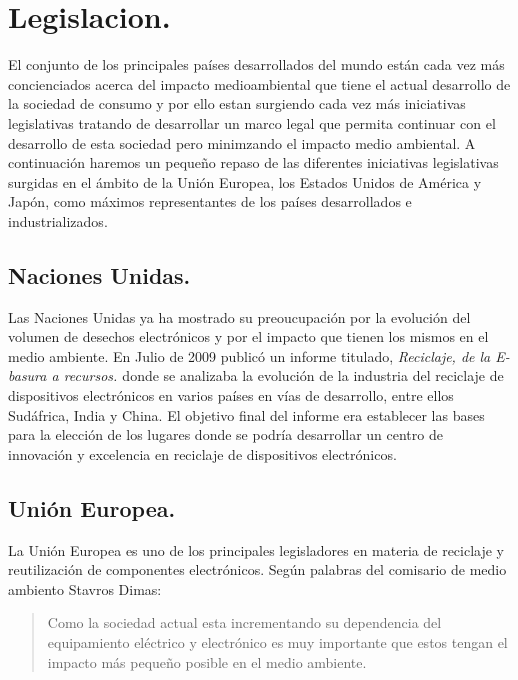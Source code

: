 \section{Legislacion.}

El conjunto de los principales países desarrollados del mundo están cada vez más concienciados acerca del impacto medioambiental que tiene el actual desarrollo de la sociedad de consumo y por ello estan surgiendo cada vez más iniciativas legislativas tratando de desarrollar un marco legal que permita continuar con el desarrollo de esta sociedad pero minimzando el impacto medio ambiental. A continuación haremos un pequeño repaso de las diferentes iniciativas legislativas surgidas en el ámbito de la Unión Europea, los Estados Unidos de América y Japón, como máximos representantes de los países desarrollados e industrializados.

\subsection{Naciones Unidas.}

Las Naciones Unidas ya ha mostrado su preoucupación por la evolución del volumen de desechos electrónicos y por el impacto que tienen los mismos en el medio ambiente. En Julio de 2009 publicó un informe titulado, \emph{Reciclaje, de la E-basura a recursos. \cite{onu-e-waste}} donde se analizaba la evolución de la industria del reciclaje de dispositivos electrónicos en varios países en vías de desarrollo, entre ellos Sudáfrica, India y China. El objetivo final del informe era establecer las bases para la elección de los lugares donde se podría desarrollar un centro de innovación y excelencia en reciclaje de dispositivos electrónicos. 

\subsection{Unión Europea.}

La Unión Europea es uno de los principales legisladores en materia de reciclaje y reutilización de componentes electrónicos. Según palabras del comisario de medio ambiento Stavros Dimas:

\begin{quote}

\small Como la sociedad actual esta incrementando su dependencia del equipamiento eléctrico y electrónico es muy importante que estos tengan el impacto más pequeño posible en el medio ambiente.

\end{quote}

